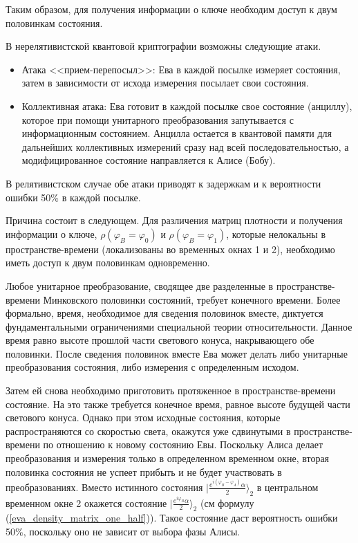 Таким образом, для получения информации о ключе необходим доступ к двум половинкам состояния.

В нерелятивистской квантовой криптографии возможны следующие атаки.
\begin{itemize}
  \item Атака <<прием-перепосыл>>: Ева в каждой посылке измеряет состояния, затем в зависимости от исхода измерения посылает свои состояния.
  \item Коллективная атака: Ева готовит в каждой посылке свое состояние (анциллу), которое при помощи унитарного преобразования запутывается с информационным состоянием.
  Анцилла остается в квантовой памяти для дальнейших коллективных измерений сразу над всей последовательностью, а модифицированное состояние направляется к Алисе (Бобу).
\end{itemize}

В релятивистском случае обе атаки приводят к задержкам и к вероятности ошибки 50\% в каждой посылке.

Причина состоит в следующем. Для различения матриц плотности и получения информации о ключе, $\rho(\varphi_B = \varphi_0)$ и $\rho(\varphi_B = \varphi_1)$, которые нелокальны в пространстве-времени (локализованы во временных окнах 1 и 2), необходимо иметь доступ к двум половинкам одновременно.

Любое унитарное преобразование, сводящее две разделенные в пространстве-времени Минковского половинки состояний, требует конечного времени. 
Более формально, время, необходимое для сведения половинок вместе, диктуется фундаментальными ограничениями специальной теории относительности.
Данное время равно высоте прошлой части светового конуса, накрывающего обе половинки. 
После сведения половинок вместе Ева может делать либо унитарные преобразования состояния, либо измерения с определенным исходом.

Затем ей снова необходимо приготовить протяженное в пространстве-времени состояние. На это также требуется конечное время, равное высоте будущей части светового конуса. 
Однако при этом исходные состояния, которые распространяются со скоростью света, окажутся уже сдвинутыми в пространстве-времени по отношению к новому состоянию Евы.
Поскольку Алиса делает преобразования и измерения только в определенном временном окне, вторая половинка состояния не успеет прибыть и не будет участвовать в преобразованиях. Вместо истинного состояния $| \frac{e^{i(\varphi_B - \varphi_A)}\alpha}{2}\rangle_2$ в центральном временном окне 2 окажется состояние $| \frac{e^{i\varphi_B}\alpha}{2} \rangle_2$ (см формулу (\ref{eva_density_matrix_one_half})). 
Такое состояние даст вероятность ошибки 50\%, поскольку оно не зависит от выбора фазы Алисы.

